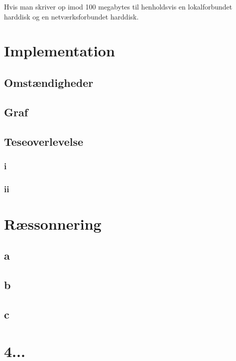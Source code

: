\documentclass{article}
\begin{document}
Hvis man skriver op imod 100 megabytes til henholdsvis en lokalforbundet harddisk og en netværksforbundet harddisk.

\section{Implementation}

\subsection{Omstændigheder}

\subsection{Graf}

\subsection{Teseoverlevelse}

\subsubsection{i}

\subsubsection{ii}

\section{Ræssonnering}

\subsection{a}
\subsection{b}
\subsection{c}

\section{4...}
\end{document}
